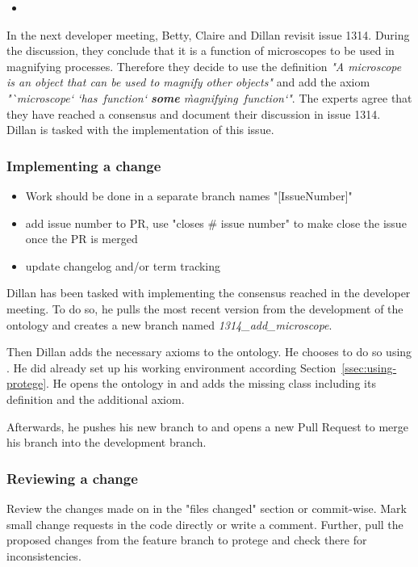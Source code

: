 \begin{itemize}
    \item 
\end{itemize}

\begin{example}
In the next developer meeting, Betty, Claire and Dillan revisit issue 1314. During the discussion, they conclude that it is a function of microscopes to be used in magnifying processes. Therefore they decide to use the definition \emph{"A microscope is an object that can be used to magnify other objects"} and add the axiom
\emph{"`microscope` `has~function` \textbf{some} \`magnifying~function`"}.
The experts agree that they have reached a consensus and document their discussion in issue 1314. Dillan is tasked with the implementation of this issue.
\end{example}

\subsubsection{Implementing a change}
\begin{itemize}
    \item  Work should be done in a separate branch names "[IssueNumber]"
    \item add issue number to PR, use "closes \# issue number" to make {\github} close the issue once the PR is merged
    \item update changelog and/or term tracking
\end{itemize}

\begin{example}
Dillan has been tasked with implementing the consensus reached in the developer meeting. To do so, he pulls the most recent version from the development of the ontology and creates a new branch named \textit{1314\_add\_microscope}.

Then Dillan adds the necessary axioms to the ontology. He chooses to do so using {\protege}. He did already set up his working environment according Section~\ref{ssec:using-protege}. He opens the ontology in {\protege} and adds the missing class including its definition and the additional axiom.

Afterwards, he pushes his new branch to {\github} and opens a new Pull Request to merge his branch into the development branch.
\end{example}

\subsubsection{Reviewing a change}
Review the changes made on {\github} in the "files changed" section or commit-wise. Mark small change requests in the code directly or write a comment. Further, pull the proposed changes from the feature branch to protege and check there for inconsistencies. 

